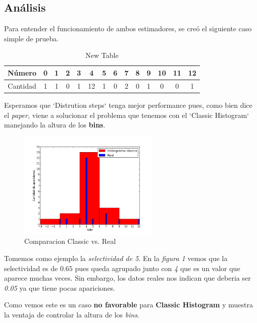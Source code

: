 \documentclass[10pt, a4paper,english,spanish,hidelinks]{article}
\begin{document}
\subsection{Análisis}

Para entender el funcionamiento de ambos estimadores, se creó el siguiente caso simple de prueba.

\begin{table}[htdp]
  \begin{center}
    \begin{tabular}{|c|c|c|c|c|c|c|c|c|c|c|c|c|c|} \hline
       Número  & 0 & 1 & 2 & 3 & 4 & 5 & 6 & 7 & 8 & 9 & 10 & 11 & 12 \\ \hline
       Cantidad & 1 & 1 & 0 & 1 & 12 & 1 & 0 & 2 & 0 & 1 & 0 & 0 & 1 \\ \hline
    \end{tabular}
  \end{center}
  \caption{New Table}
  \label{tab:newTable}
\end{table}


Esperamos que `Distrution steps` tenga mejor performance pues, como bien dice el \textit{paper},
viene a solucionar el problema que tenemos con el `Classic Histogram` manejando la altura
de los \textbf{bins}.

\begin{figure}[h!]
  \centering
  \includegraphics[width=0.6\textwidth]{./imagenes/ejb1_ejemplo_classic_y_real.png}
  \caption{Comparacion Classic vs. Real}
\end{figure}


Tomemos como ejemplo la \textit{selectividad de 5}.
En la \textit{figura 1} vemos que la selectividad es de $0.65$ pues queda agrupado junto con \textit{4}
que es un valor que aparece muchas veces. Sin embargo, los datos reales nos indican que deberia
ser \textit{0.05} ya que tiene pocas apariciones.

Como vemos este es un caso \textbf{no favorable} para \textbf{Classic Histogram} y muestra la ventaja
de controlar la altura de los \textit{bins}.
\end{document}
